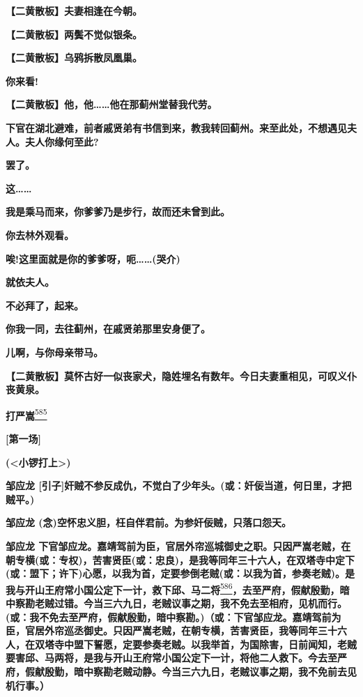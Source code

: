 \textbf{【二黄散板】夫妻相逢在今朝。}

\textbf{【二黄散板】两鬓不觉似银条。}

\textbf{【二黄散板】乌鸦拆散凤凰巢。}

\textbf{你来看!}

\textbf{【二黄散板】他，他\ldots{}\ldots{}他在那蓟州堂替我代劳。}

\textbf{下官在湖北避难，前者戚贤弟有书信到来，教我转回蓟州。来至此处，不想遇见夫人。夫人你缘何至此?}

\textbf{罢了。}

\textbf{这\ldots{}\ldots{}}

\textbf{我是乘马而来，你爹爹乃是步行，故而还未曾到此。}

\textbf{你去林外观看。}

\textbf{唉!这里面就是你的爹爹呀，呃\ldots{}\ldots{}(哭介)}

\textbf{就依夫人。}

\textbf{不必拜了，起来。}

\textbf{你我一同，去往蓟州，在戚贤弟那里安身便了。}

\textbf{儿啊，与你母亲带马。}

\textbf{【二黄散板】莫怀古好一似丧家犬，隐姓埋名有数年。今日夫妻重相见，可叹义仆丧黄泉。}

\textbf{打严嵩}\protect\hyperlink{fn585}{\textsuperscript{585}}

\textbf{{[}第一场{]}}

\textbf{(\textless{}小锣打上\textgreater{})}

\textbf{邹应龙
{[}引子{]}奸贼不参反成仇，不觉白了少年头。(或：奸佞当道，何日里，才把贼平。)}

\textbf{邹应龙 (念)空怀忠义胆，枉自伴君前。为参奸佞贼，只落口怨天。}

\textbf{邹应龙
下官邹应龙。嘉靖驾前为臣，官居外帘巡城御史之职。只因严嵩老贼，在朝专横(或：专权)，苦害贤臣(或：忠良)，是我等同年三十六人，在双塔寺中定下(或：盟下；许下)心愿，以我为首，定要参倒老贼(或：以我为首，参奏老贼)。是我与开山王府常小国公定下一计，救下邱、马二将}\protect\hyperlink{fn586}{\textsuperscript{586}}\textbf{，去至严府，假献殷勤，暗中察勘老贼过错。今当三六九日，老贼议事之期，我不免去至相府，见机而行。(或：我不免去至严府，假献殷勤，暗中察勘。)（或：下官邹应龙。嘉靖驾前为臣，官居外帘巡丞御史。只因严嵩老贼，在朝专横，苦害贤臣，我等同年三十六人，在双塔寺中盟下誓愿，定要参奏老贼。以我举首，为国除害，日前闻知，老贼要害邱、马两将，是我与开山王府常小国公定下一计，将他二人救下。今去至严府，假献殷勤，暗中察勘老贼动静。今当三六九日，老贼议事之期，我不免前去见机行事。）}

